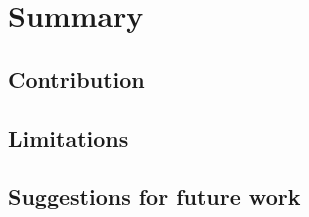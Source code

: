 
\chapter{Summary}

\section{Contribution}

\section{Limitations}

\section{Suggestions for future work}
